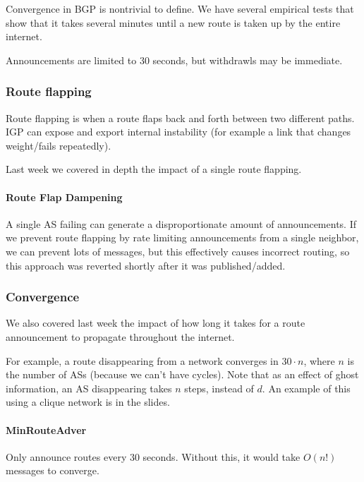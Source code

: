 \documentclass{idc_msc}
\begin{document}
Convergence in BGP is nontrivial to define.
We have several empirical tests that show that it takes several minutes until a new route is taken up by the entire internet.

Announcements are limited to 30 seconds, but withdrawls may be immediate.

\subsubsection{Route flapping}

Route flapping is when a route flaps back and forth between two different paths.
IGP can expose and export internal instability (for example a link that changes weight/fails repeatedly).

Last week we covered in depth the impact of a single route flapping.

\paragraph{Route Flap Dampening}

A single AS failing can generate a disproportionate amount of announcements.
If we prevent route flapping by rate limiting announcements from a single neighbor, we can prevent lots of messages, but this effectively causes incorrect routing, so this approach was reverted shortly after it was published/added.\cite{Mao:2002:RFD:964725.633047}

\subsubsection{Convergence}

We also covered last week the impact of how long it takes for a route announcement to propagate throughout the internet.

For example, a route disappearing from a network converges in \(30 \cdot n\), where \(n\) is the number of ASs (because we can't have cycles).
Note that as an effect of ghost information, an AS disappearing takes \(n\) steps, instead of \(d\).
An example of this using a clique network is in the slides.

\paragraph{MinRouteAdver}

Only announce routes every 30 seconds.
Without this, it would take \(O(n!)\) messages to converge.
\end{document}

